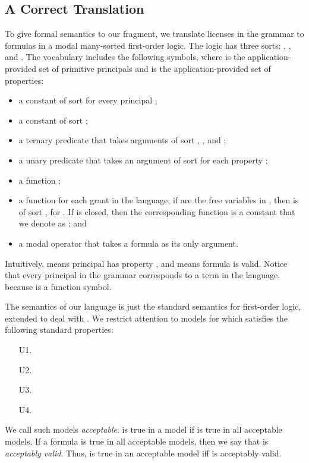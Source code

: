 \documentclass{acmtrans2m}
\newcommand{\<}{
}
\renewcommand{\>}{\rangle}
\begin{document}
\subsection{A Correct Translation}\label{s:correctSemantics}
To give formal semantics to our fragment, we translate licenses in the grammar to formulas
in a modal many-sorted first-order logic.
The logic has three sorts: , , and .  The vocabulary includes
the following symbols, where  is the application-provided set of primitive
principals and  is the application-provided set of properties:
\begin{itemize}
\item a constant  of sort  for every principal ;
\item a constant  of sort ;
\item a ternary predicate  that takes arguments of sort , , and
;
\item a unary predicate  that takes an argument of sort  for each property
;
\item a function ;
\item a function  for each grant  in
the language; if  are the free variables in , then  is of sort
, for .  If  is closed, then the corresponding function is a
constant that we denote as ; and
\item a modal operator  that takes a formula as its only argument.
\end{itemize}
Intuitively,  means principal  has property , and  means formula
 is valid.  Notice that every principal in the grammar corresponds to a term in the
language, because  is a function symbol.

The semantics of our language is just the standard semantics for first-order logic, extended
to deal with .  We restrict attention to models for which  satisfies the
following standard properties:
\begin{itemize}
\item[U1.] 
\item[U2.] 
\item[U3.] 
\item[U4.] 
\end{itemize}
We call such models \emph{acceptable}.   is true in a model  if  is true
in all acceptable models.  If a formula  is true in all acceptable models, then we say
that  is \emph{acceptably valid}.  Thus,  is true in an acceptable model iff
 is acceptably valid.
\end{document}
